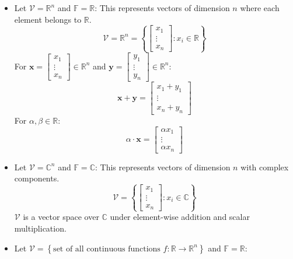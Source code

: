     \begin{example}
        \begin{itemize}
            \item Let \( \mathcal{V} = \mathbb{R}^n \) and \( \mathbb{F} = \mathbb{R} \): This represents vectors of dimension \( n \) where each element belongs to \( \mathbb{R} \).
            \[
            \mathcal{V} = \mathbb{R}^n = \left\{ \begin{bmatrix} x_1 \\ \vdots \\ x_n \end{bmatrix} : x_i \in \mathbb{R} \right\}
            \]
            For \( \mathbf{x} = \begin{bmatrix} x_1 \\ \vdots \\ x_n \end{bmatrix} \in \mathbb{R}^n \) and \( \mathbf{y} = \begin{bmatrix} y_1 \\ \vdots \\ y_n \end{bmatrix} \in \mathbb{R}^n \):
            \[
            \mathbf{x} + \mathbf{y} = \begin{bmatrix} x_1 + y_1 \\ \vdots \\ x_n + y_n \end{bmatrix}
            \]
            For \( \alpha, \beta \in \mathbb{R} \):
            \[
            \alpha \cdot \mathbf{x} = \begin{bmatrix} \alpha x_1 \\ \vdots \\ \alpha x_n \end{bmatrix}
            \]
        
            \item Let \( \mathcal{V} = \mathbb{C}^n \) and \( \mathbb{F} = \mathbb{C} \): This represents vectors of dimension \( n \) with complex components.
            \[
            \mathcal{V} = \left\{ \begin{bmatrix} x_1 \\ \vdots \\ x_n \end{bmatrix} : x_i \in \mathbb{C} \right\}
            \]
            \( \mathcal{V} \) is a vector space over \( \mathbb{C} \) under element-wise addition and scalar multiplication.
        
            \item Let \( \mathcal{V} = \left\{ \text{set of all continuous functions } f: \mathbb{R} \to \mathbb{R}^n \right\} \) and \( \mathbb{F} = \mathbb{R} \):
            

\end{itemize}
\end{example}
